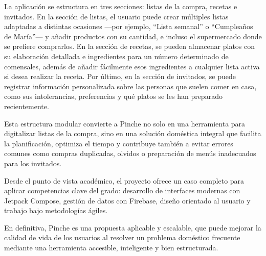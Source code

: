 La aplicación se estructura en tres secciones: listas de la compra, recetas e invitados. En la sección de listas, el usuario puede crear múltiples listas adaptadas a distintas ocasiones —por ejemplo, “Lista semanal” o “Cumpleaños de María”— y añadir productos con su cantidad, e incluso el supermercado donde se prefiere comprarlos. En la sección de recetas, se pueden almacenar platos con su elaboración detallada e ingredientes para un número determinado de comensales, además de añadir fácilmente esos ingredientes a cualquier lista activa si desea realizar la receta. Por último, en la sección de invitados, se puede registrar información personalizada sobre las personas que suelen comer en casa, como sus intolerancias, preferencias y qué platos se les han preparado recientemente.

Esta estructura modular convierte a Pinche no solo en una herramienta para digitalizar listas de la compra, sino en una solución doméstica integral que facilita la planificación, optimiza el tiempo y contribuye también a evitar errores comunes como compras duplicadas, olvidos o preparación de menús inadecuados para los invitados.

Desde el punto de vista académico, el proyecto ofrece un caso completo para aplicar competencias clave del grado: desarrollo de interfaces modernas con Jetpack Compose, gestión de datos con Firebase, diseño orientado al usuario y trabajo bajo metodologías ágiles.

En definitiva, Pinche es una propuesta aplicable y escalable, que puede mejorar la calidad de vida de los usuarios al resolver un problema doméstico frecuente mediante una herramienta accesible, inteligente y bien estructurada.